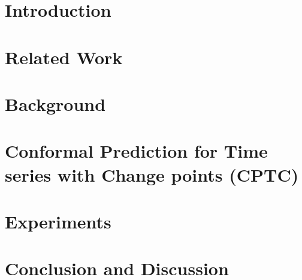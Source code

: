 
\section{Introduction}


\section{Related Work}


\section{Background}


\section{Conformal Prediction for Time series with Change points (CPTC)}


\section{Experiments}


\section{Conclusion and Discussion}

